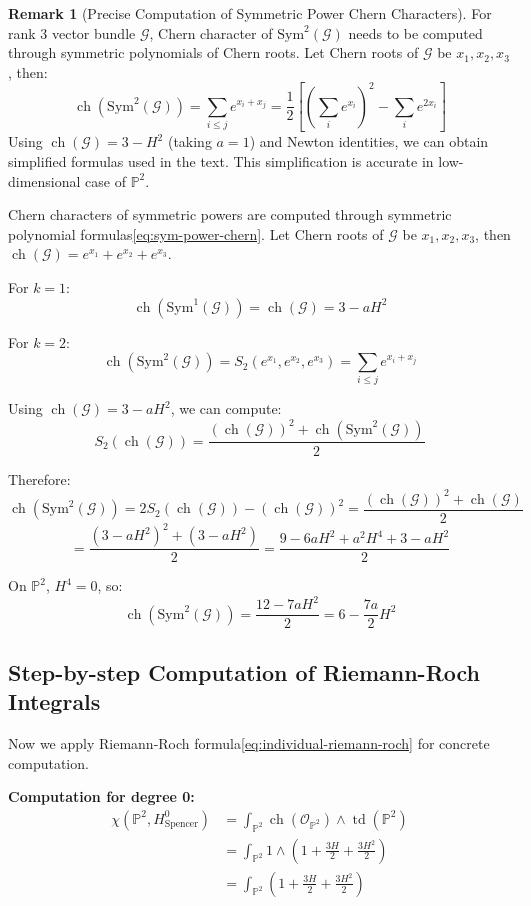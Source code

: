 \documentclass[a4paper,12pt]{extarticle}
\newcommand{\ch}{\operatorname{ch}}
\newcommand{\td}{\operatorname{td}}
\theoremstyle{definition}
\newtheorem{remark}{Remark}
\begin{document}
\begin{remark}[Precise Computation of Symmetric Power Chern Characters]
For rank 3 vector bundle $\mathcal{G}$, Chern character of $\mathrm{Sym}^2(\mathcal{G})$ needs to be computed through symmetric polynomials of Chern roots. Let Chern roots of $\mathcal{G}$ be $x_1, x_2, x_3$, then:
$$\ch(\mathrm{Sym}^2(\mathcal{G})) = \sum_{i \leq j} e^{x_i + x_j} = \frac{1}{2}[(\sum_i e^{x_i})^2 - \sum_i e^{2x_i}]$$
Using $\ch(\mathcal{G}) = 3 - H^2$ (taking $a=1$) and Newton identities, we can obtain simplified formulas used in the text. This simplification is accurate in low-dimensional case of $\mathbb{P}^2$.
\end{remark}

Chern characters of symmetric powers are computed through symmetric polynomial formulas\eqref{eq:sym-power-chern}. Let Chern roots of $\mathcal{G}$ be $x_1, x_2, x_3$, then $\ch(\mathcal{G}) = e^{x_1} + e^{x_2} + e^{x_3}$.

For $k = 1$:
$$\ch(\mathrm{Sym}^1(\mathcal{G})) = \ch(\mathcal{G}) = 3 - aH^2$$

For $k = 2$:
$$\ch(\mathrm{Sym}^2(\mathcal{G})) = S_2(e^{x_1}, e^{x_2}, e^{x_3}) = \sum_{i \leq j} e^{x_i + x_j}$$

Using $\ch(\mathcal{G}) = 3 - aH^2$, we can compute:
$$S_2(\ch(\mathcal{G})) = \frac{(\ch(\mathcal{G}))^2 + \ch(\mathrm{Sym}^2(\mathcal{G}))}{2}$$

Therefore:
$$\ch(\mathrm{Sym}^2(\mathcal{G})) = 2S_2(\ch(\mathcal{G})) - (\ch(\mathcal{G}))^2 = \frac{(\ch(\mathcal{G}))^2 + \ch(\mathcal{G})}{2}$$
$$= \frac{(3-aH^2)^2 + (3-aH^2)}{2} = \frac{9 - 6aH^2 + a^2H^4 + 3 - aH^2}{2}$$

On $\mathbb{P}^2$, $H^4 = 0$, so:
$$\ch(\mathrm{Sym}^2(\mathcal{G})) = \frac{12 - 7aH^2}{2} = 6 - \frac{7a}{2}H^2$$

\subsection{Step-by-step Computation of Riemann-Roch Integrals}

Now we apply Riemann-Roch formula\eqref{eq:individual-riemann-roch} for concrete computation.

\textbf{Computation for degree 0:}
\begin{align}
\chi(\mathbb{P}^2, H^0_{\mathrm{Spencer}}) &= \int_{\mathbb{P}^2} \ch(\mathcal{O}_{\mathbb{P}^2}) \wedge \td(\mathbb{P}^2) \\
&= \int_{\mathbb{P}^2} 1 \wedge \left(1 + \frac{3H}{2} + \frac{3H^2}{2}\right) \\
&= \int_{\mathbb{P}^2} \left(1 + \frac{3H}{2} + \frac{3H^2}{2}\right)
\end{align}
\end{document}
